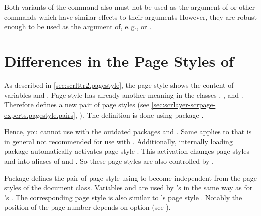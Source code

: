 Both variants of the command also must not be used as the
argument of  or other commands
which have similar effects to their arguments However, they are robust enough
to be used as the argument of, e.\,g.,  or
.%
%
\EndIndexGroup
%
\EndIndexGroup


\section{Differences in the Page Styles of }
\BeginIndexGroup
{}

As described in \autoref{sec:scrlttr2.pagestyle}, the page style
 shows the content of variables  and
. Page style  has already another
meaning in the \KOMAScript{} classes , , and
. Therefore  defines a new pair of page
styles (see \autoref{sec:scrlayer-scrpage-experts.pagestyle.pairs},
).  The definition
is done using package
.

Hence, you cannot use  with the outdated packages
 and
. Same applies to
 that is in general not recommended
for use with \KOMAScript. Additionally, internally loading package
 automatically activates page style
. This activation
changes page styles  and  into aliases of
 and . So these page
styles are also controlled by .

\begin{Declaration}
\end{Declaration}
Package  defines the pair of page style 
using  to become independent from the page styles of
the document class. Variables  and
 are used by 's
 in the same way as for 's
. The corresponding  page style is also
similar to 's page style . Notably the
position of the page number depends on option
 (see
).%
\EndIndexGroup



